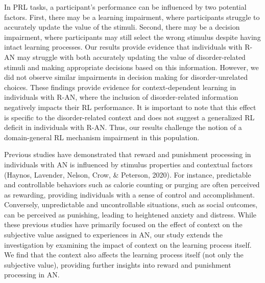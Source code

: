 \documentclass[
  man,floatsintext]{apa6}
\begin{document}
In PRL tasks, a participant's performance can be influenced by two potential factors. First, there may be a learning impairment, where participants struggle to accurately update the value of the stimuli. Second, there may be a decision impairment, where participants may still select the wrong stimulus despite having intact learning processes. Our results provide evidence that individuals with R-AN may struggle with both accurately updating the value of disorder-related stimuli and making appropriate decisions based on this information. However, we did not observe similar impairments in decision making for disorder-unrelated choices. These findings provide evidence for context-dependent learning in individuals with R-AN, where the inclusion of disorder-related information negatively impacts their RL performance. It is important to note that this effect is specific to the disorder-related context and does not suggest a generalized RL deficit in individuals with R-AN. Thus, our results challenge the notion of a domain-general RL mechanism impairment in this population.

Previous studies have demonstrated that reward and punishment processing in individuals with AN is influenced by stimulus properties and contextual factors (Haynos, Lavender, Nelson, Crow, \& Peterson, 2020). For instance, predictable and controllable behaviors such as calorie counting or purging are often perceived as rewarding, providing individuals with a sense of control and accomplishment. Conversely, unpredictable and uncontrollable situations, such as social outcomes, can be perceived as punishing, leading to heightened anxiety and distress. While these previous studies have primarily focused on the effect of context on the subjective value assigned to experiences in AN, our study extends the investigation by examining the impact of context on the learning process itself. We find that the context also affects the learning process itself (not only the subjective value), providing further insights into reward and punishment processing in AN.
\end{document}
